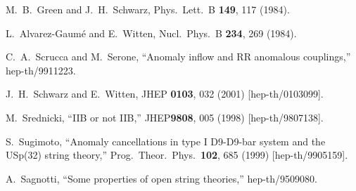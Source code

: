 \documentclass[a4paper,12pt]{article}
\begin{document}
\begin{thebibliography}{99}

M.~B.~Green and J.~H.~Schwarz,
Phys.\ Lett.\ B {\bf 149}, 117 (1984).

L.~Alvarez-Gaum\'e and E.~Witten,
Nucl.\ Phys.\ B {\bf 234}, 269 (1984).


C.~A.~Scrucca and M.~Serone, ``Anomaly inflow and RR anomalous
couplings,'' hep-th/9911223.

J.~H.~Schwarz and E.~Witten,
JHEP {\bf 0103}, 032 (2001)
[hep-th/0103099].

M.~Srednicki, ``IIB or not IIB,'' JHEP{\bf 9808}, 005 (1998)
[hep-th/9807138].

S.~Sugimoto, ``Anomaly cancellations in type I D9-D9-bar system
and the USp(32)  string theory,'' Prog.\ Theor.\ Phys.\ {\bf 102},
685 (1999) [hep-th/9905159].

A.~Sagnotti, ``Some properties of open string theories,''
hep-th/9509080.

\end{thebibliography}
\end{document}
